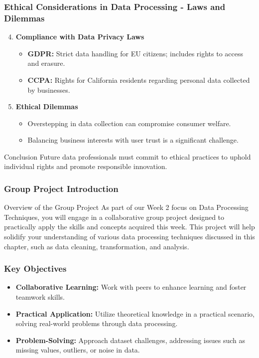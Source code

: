 \documentclass[aspectratio=169]{beamer}
\begin{document}
\begin{frame}[fragile]
    \frametitle{Ethical Considerations in Data Processing - Laws and Dilemmas}
    \begin{enumerate}
        \setcounter{enumi}{3}
        \item \textbf{Compliance with Data Privacy Laws}
            \begin{itemize}
                \item \textbf{GDPR:} Strict data handling for EU citizens; includes rights to access and erasure.
                \item \textbf{CCPA:} Rights for California residents regarding personal data collected by businesses.
            \end{itemize}
        
        \item \textbf{Ethical Dilemmas}
            \begin{itemize}
                \item Overstepping in data collection can compromise consumer welfare.
                \item Balancing business interests with user trust is a significant challenge.
            \end{itemize}
    \end{enumerate}

    \begin{block}{Conclusion}
        Future data professionals must commit to ethical practices to uphold individual rights and promote responsible innovation.
    \end{block}
\end{frame}

\begin{frame}[fragile]
    \frametitle{Group Project Introduction}
    \begin{block}{Overview of the Group Project}
        As part of our Week 2 focus on Data Processing Techniques, you will engage in a collaborative group project designed to practically apply the skills and concepts acquired this week. This project will help solidify your understanding of various data processing techniques discussed in this chapter, such as data cleaning, transformation, and analysis.
    \end{block}
\end{frame}

\begin{frame}[fragile]
    \frametitle{Key Objectives}
    \begin{itemize}
        \item \textbf{Collaborative Learning:} Work with peers to enhance learning and foster teamwork skills.
        \item \textbf{Practical Application:} Utilize theoretical knowledge in a practical scenario, solving real-world problems through data processing.
        \item \textbf{Problem-Solving:} Approach dataset challenges, addressing issues such as missing values, outliers, or noise in data.
    \end{itemize}
\end{frame}
\end{document}
